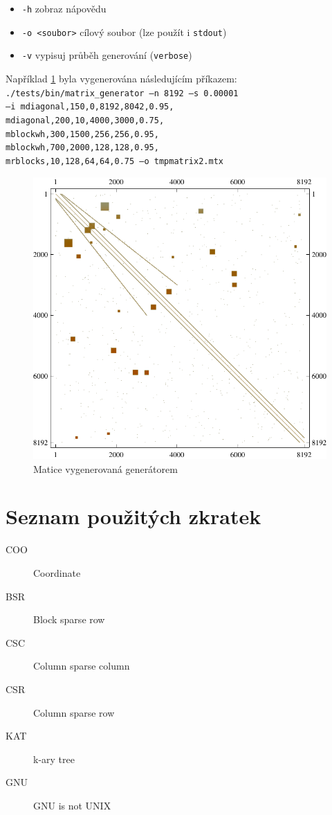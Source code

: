 \documentclass[thesis=B,czech]{FITthesis}[2012/06/26]
\begin{document}
 \begin{itemize}
 	\item \texttt{-h} zobraz nápovědu
 	\item \texttt{-o <soubor>} cílový soubor (lze použít i \texttt{stdout}) 
 	\item \texttt{-v} vypisuj průběh generování (\texttt{verbose})
 \end{itemize}

 Například \ref{fig:generatedMtx} byla vygenerována následujícím příkazem: \\
 \texttt{./tests/bin/matrix\_generator --n 8192 --s 0.00001 \\
 --i mdiagonal,150,0,8192,8042,0.95, \\
 mdiagonal,200,10,4000,3000,0.75, \\
 mblockwh,300,1500,256,256,0.95, \\
 mblockwh,700,2000,128,128,0.95, \\
 mrblocks,10,128,64,64,0.75 --o \/tmp\/matrix2.mtx}

\begin{figure}[htb]
	\includegraphics[width=1.0\textwidth]{./images/generated_matrix}
	\caption{Matice vygenerovaná generátorem}
	\label{fig:generatedMtx}
\end{figure}




\chapter{Seznam použitých zkratek}
\begin{description}
	\item[COO] Coordinate
	\item[BSR] Block sparse row
	\item[CSC] Column sparse column
	\item[CSR] Column sparse row
	\item[KAT] k-ary tree
	\item[GNU] GNU is not UNIX
\end{description}
\end{document}
